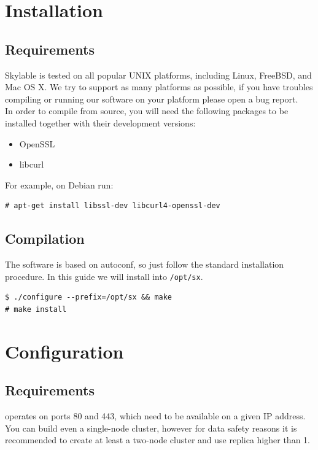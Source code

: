 \chapter{Installation}

\section*{Requirements}

Skylable \SX is tested on all popular UNIX platforms, including Linux,
FreeBSD, and Mac OS X. We try to support as many platforms as possible,
if you have troubles compiling or running our software on your platform
please open a bug report.\\

In order to compile \SX from source, you
will need the following packages to be installed together with their
development versions:
\begin{itemize}
    \item OpenSSL
    \item libcurl
\end{itemize}
For example, on Debian run:
\small
\begin{lstlisting}
# apt-get install libssl-dev libcurl4-openssl-dev
\end{lstlisting}
\LARGE

\section*{Compilation}

The software is based on autoconf, so just follow the standard installation
procedure. In this guide we will install \SX into \verb+/opt/sx+.
\small
\begin{lstlisting}
$ ./configure --prefix=/opt/sx && make
# make install
\end{lstlisting}
\LARGE


\chapter{Configuration}

\section*{Requirements}

\SX operates on ports 80 and 443, which need to be available on a given
IP address. You can build even a single-node \SX cluster, however for data
safety reasons it is recommended to create at least a two-node cluster and
use replica higher than 1.

